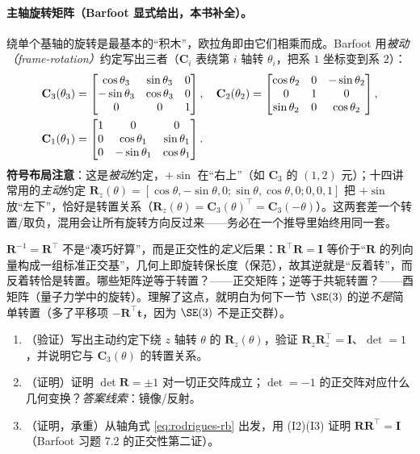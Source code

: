 \paragraph{主轴旋转矩阵（Barfoot 显式给出，本书补全）。}绕单个基轴的旋转是最基本的“积木”，欧拉角即由它们相乘而成。Barfoot 用\emph{被动（frame-rotation）}约定写出三者\cite{barfoot2024state}（$\mathbf{C}_i$ 表绕第 $i$ 轴转 $\theta_i$，把系 $1$ 坐标变到系 $2$）：
\begin{align}
  \mathbf{C}_3(\theta_3)&=\begin{bmatrix}\cos\theta_3&\sin\theta_3&0\\-\sin\theta_3&\cos\theta_3&0\\0&0&1\end{bmatrix},\quad
  \mathbf{C}_2(\theta_2)=\begin{bmatrix}\cos\theta_2&0&-\sin\theta_2\\0&1&0\\\sin\theta_2&0&\cos\theta_2\end{bmatrix},\notag\\
  \mathbf{C}_1(\theta_1)&=\begin{bmatrix}1&0&0\\0&\cos\theta_1&\sin\theta_1\\0&-\sin\theta_1&\cos\theta_1\end{bmatrix}.
  \label{eq:rb-principal}
\end{align}
\textbf{符号布局注意}：这是\emph{被动}约定，$+\sin$ 在“右上”（如 $\mathbf{C}_3$ 的 $(1,2)$ 元）；十四讲常用的\emph{主动}约定 $\mathbf{R}_z(\theta)=[\cos\theta,-\sin\theta,0;\sin\theta,\cos\theta,0;0,0,1]$ 把 $+\sin$ 放“左下”，恰好是转置关系（$\mathbf{R}_z(\theta)=\mathbf{C}_3(\theta)^\top=\mathbf{C}_3(-\theta)$）。这两套差一个转置/取负，混用会让所有旋转方向反过来——务必在一个推导里始终用同一套。

\begin{pitfall}[概念误区：把 $\mathbf{R}^{-1}=\mathbf{R}^\top$ 当巧合]
$\mathbf{R}^{-1}=\mathbf{R}^\top$ 不是“凑巧好算”，而是正交性的\emph{定义}后果：$\mathbf{R}^\top\mathbf{R}=\mathbf{I}$ 等价于“$\mathbf{R}$ 的列向量构成一组标准正交基”，几何上即旋转保长度（保范），故其逆就是“反着转”，而反着转恰是转置。哪些矩阵逆等于转置？——正交矩阵；逆等于共轭转置？——酉矩阵（量子力学中的旋转）。理解了这点，就明白为何下一节 $\SE(3)$ 的逆\emph{不是}简单转置（多了平移项 $-\mathbf{R}^\top\mathbf{t}$，因为 $\SE(3)$ 不是正交群）。
\end{pitfall}

\begin{practice}
\begin{enumerate}
  \item （验证）写出主动约定下绕 $z$ 轴转 $\theta$ 的 $\mathbf{R}_z(\theta)$，验证 $\mathbf{R}_z\mathbf{R}_z^\top=\mathbf{I}$、$\det=1$，并说明它与 $\mathbf{C}_3(\theta)$ 的转置关系。
  \item （证明）证明 $\det\mathbf{R}=\pm1$ 对一切正交阵成立；$\det=-1$ 的正交阵对应什么几何变换？\emph{答案线索}：镜像/反射。
  \item （证明，承重）从轴角式 \cref{eq:rodrigues-rb} 出发，用 (I2)(I3) 证明 $\mathbf{R}\mathbf{R}^\top=\mathbf{I}$（Barfoot 习题 7.2 的正交性第二证）。
\end{enumerate}
\end{practice}

